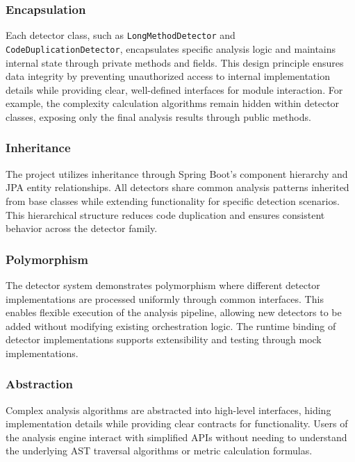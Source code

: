 \documentclass[12pt,a4paper]{article}
\begin{document}
    \subsubsection{Encapsulation}

    Each detector class, such as \texttt{LongMethodDetector} and \texttt{CodeDuplicationDetector}, encapsulates specific analysis logic and maintains internal state through private methods and fields. This design principle ensures data integrity by preventing unauthorized access to internal implementation details while providing clear, well-defined interfaces for module interaction. For example, the complexity calculation algorithms remain hidden within detector classes, exposing only the final analysis results through public methods.

    \subsubsection{Inheritance}

    The project utilizes inheritance through Spring Boot's component hierarchy and JPA entity relationships. All detectors share common analysis patterns inherited from base classes while extending functionality for specific detection scenarios. This hierarchical structure reduces code duplication and ensures consistent behavior across the detector family.

    \subsubsection{Polymorphism}

    The detector system demonstrates polymorphism where different detector implementations are processed uniformly through common interfaces. This enables flexible execution of the analysis pipeline, allowing new detectors to be added without modifying existing orchestration logic. The runtime binding of detector implementations supports extensibility and testing through mock implementations.

    \subsubsection{Abstraction}

    Complex analysis algorithms are abstracted into high-level interfaces, hiding implementation details while providing clear contracts for functionality. Users of the analysis engine interact with simplified APIs without needing to understand the underlying AST traversal algorithms or metric calculation formulas.
\end{document}
